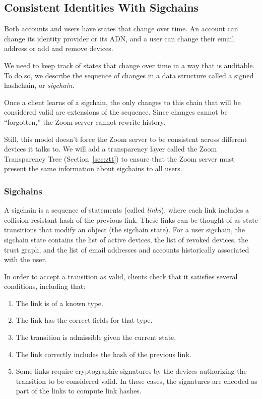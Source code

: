 \subsection{Consistent Identities With Sigchains}
\label{subsec:sigchains}

Both accounts and users have states that change over time. An account can change its identity
provider or its ADN, and a user can change their email address or add and remove devices.

We need to keep track of states that change over time in a way that is auditable. To do so, we
describe the sequence of changes in a data structure called a signed hashchain, or
\textit{sigchain}.

Once a client learns of a sigchain, the only changes to this chain that will be considered valid are
extensions of the sequence. Since changes cannot be ``forgotten,'' the Zoom server cannot rewrite
history.

Still, this model doesn't force the Zoom server to be consistent across different devices it talks
to. We will add a transparency layer called the Zoom Transparency Tree (Section~\ref{sec:ztt}) to
ensure that the Zoom server must present the same information about sigchains to all users.

\subsubsection{Sigchains}

A sigchain is a sequence of statements (called \textit{links}), where each link includes a
collision-resistant hash of the previous link. These links can be thought of as state transitions
that modify an object (the sigchain state). For a user sigchain, the sigchain state contains the
list of active devices, the list of revoked devices, the trust graph, and the list of email
addresses and accounts historically associated with the user.

In order to accept a transition as valid, clients check that it satisfies several conditions,
including that:

\begin{enumerate}
\item The link is of a known type.
\item The link has the correct fields for that type.
\item The transition is admissible given the current state.
\item The link correctly includes the hash of the previous link.
\item Some links require cryptographic signatures by the devices authorizing the transition to be
    considered valid. In these cases, the signatures are encoded as part of the links to compute
    link hashes.
\end{enumerate}

